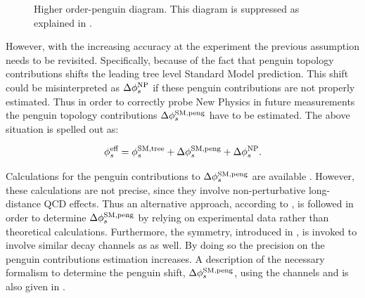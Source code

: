 \begin{figure}[h]
  \centering
  {\sffamily }
  \caption{ Higher order-penguin diagram. This diagram is suppressed as explained in .}
  \label{bs2jpsiphi_peng}
\end{figure}

However, with the increasing accuracy at the \lhcb experiment the previous assumption needs to be revisited.
Specifically, because of the fact that penguin topology contributions shifts the leading tree level Standard Model prediction.
This shift could be misinterpreted as $\Delta\phi_{s}^{\tiny\text{NP}}$ if these penguin contributions are not properly estimated.
Thus in order to correctly probe New Physics in future measurements the penguin topology contributions $\Delta\phi_{s}^{\tiny\text{SM,peng}}$
have to be estimated. The above situation is spelled out as:

\begin{equation}
\centering
 \phis^{\text {eff}} = \phis^{\tiny \text{SM,tree}} + \Delta\phiS{SM,peng} + \Delta\phis^{\tiny \text{NP}}.
 \label{phis_sm_peng}
\end{equation}

\noindent Calculations for the penguin contributions to $\Delta\phi_{s}^{\tiny\text{SM,peng}}$ are available \cite{Liu:2013nea,Frings:2015eva}.
However, these calculations are not precise, since they involve non-perturbative long-distance QCD effects. Thus an alternative
approach, according to \cite{DeBruyn:2014oga,Frings:2015eva,Faller:2008gt,Liu:2013nea,DeBruyn-thesis}, is followed in order to
determine $\Delta\phi_{s}^{\tiny\text{SM,peng}}$ by relying on experimental data rather than theoretical calculations.
Furthermore, the \grpsuthree symmetry, introduced in , is invoked to involve similar decay channels as \BsJpsiPhi as well.
By doing so the precision on the penguin contributions estimation increases. A description of the necessary formalism to determine
the penguin shift, $\Delta\phi_{s}^{\tiny\text{SM,peng}}$, using the channels \BsJpsiKst and \BsJpsiRho is also given in .
